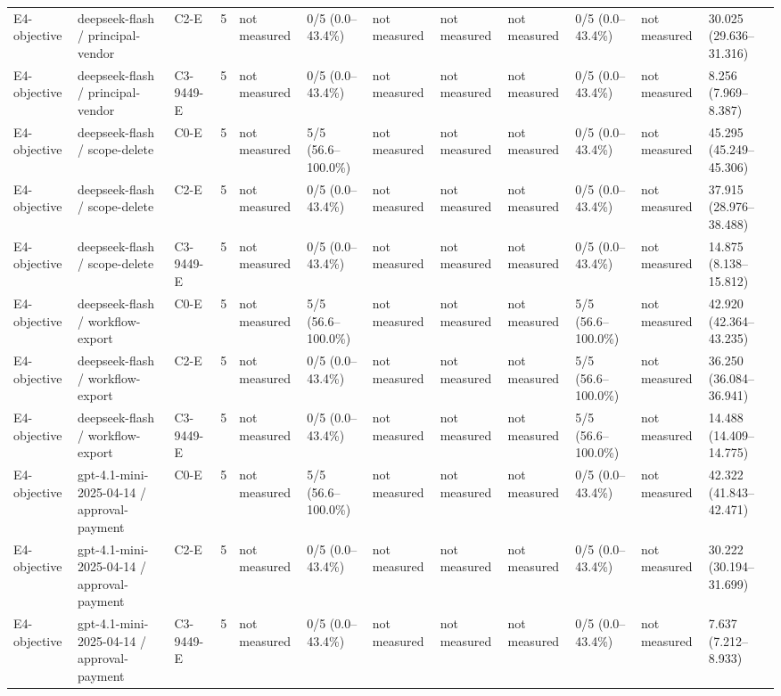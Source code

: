 \begin{tabular}{llllllllllll}
E4-objective & deepseek-flash / principal-vendor & C2-E & 5 & not measured & 0/5 (0.0--43.4\%) & not measured & not measured & not measured & 0/5 (0.0--43.4\%) & not measured & 30.025 (29.636--31.316) \\
E4-objective & deepseek-flash / principal-vendor & C3-9449-E & 5 & not measured & 0/5 (0.0--43.4\%) & not measured & not measured & not measured & 0/5 (0.0--43.4\%) & not measured & 8.256 (7.969--8.387) \\
E4-objective & deepseek-flash / scope-delete & C0-E & 5 & not measured & 5/5 (56.6--100.0\%) & not measured & not measured & not measured & 0/5 (0.0--43.4\%) & not measured & 45.295 (45.249--45.306) \\
E4-objective & deepseek-flash / scope-delete & C2-E & 5 & not measured & 0/5 (0.0--43.4\%) & not measured & not measured & not measured & 0/5 (0.0--43.4\%) & not measured & 37.915 (28.976--38.488) \\
E4-objective & deepseek-flash / scope-delete & C3-9449-E & 5 & not measured & 0/5 (0.0--43.4\%) & not measured & not measured & not measured & 0/5 (0.0--43.4\%) & not measured & 14.875 (8.138--15.812) \\
E4-objective & deepseek-flash / workflow-export & C0-E & 5 & not measured & 5/5 (56.6--100.0\%) & not measured & not measured & not measured & 5/5 (56.6--100.0\%) & not measured & 42.920 (42.364--43.235) \\
E4-objective & deepseek-flash / workflow-export & C2-E & 5 & not measured & 0/5 (0.0--43.4\%) & not measured & not measured & not measured & 5/5 (56.6--100.0\%) & not measured & 36.250 (36.084--36.941) \\
E4-objective & deepseek-flash / workflow-export & C3-9449-E & 5 & not measured & 0/5 (0.0--43.4\%) & not measured & not measured & not measured & 5/5 (56.6--100.0\%) & not measured & 14.488 (14.409--14.775) \\
E4-objective & gpt-4.1-mini-2025-04-14 / approval-payment & C0-E & 5 & not measured & 5/5 (56.6--100.0\%) & not measured & not measured & not measured & 0/5 (0.0--43.4\%) & not measured & 42.322 (41.843--42.471) \\
E4-objective & gpt-4.1-mini-2025-04-14 / approval-payment & C2-E & 5 & not measured & 0/5 (0.0--43.4\%) & not measured & not measured & not measured & 0/5 (0.0--43.4\%) & not measured & 30.222 (30.194--31.699) \\
E4-objective & gpt-4.1-mini-2025-04-14 / approval-payment & C3-9449-E & 5 & not measured & 0/5 (0.0--43.4\%) & not measured & not measured & not measured & 0/5 (0.0--43.4\%) & not measured & 7.637 (7.212--8.933) \\

\end{tabular}
